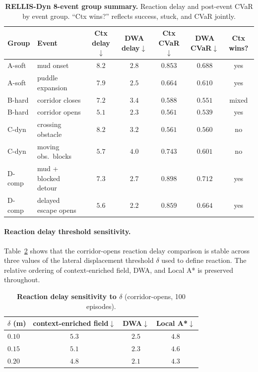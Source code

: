 \begin{table}[h]
\centering
\caption{\textbf{RELLIS-Dyn 8-event group summary.}
Reaction delay and post-event CVaR by event group.
``Ctx wins?'' reflects success, stuck, and CVaR jointly.}
\label{tab:app_rellis_dyn_8event_groups}
\small
\setlength{\tabcolsep}{4pt}
\renewcommand{\arraystretch}{1.08}
\begin{tabular}{llccccc}
\toprule
Group & Event
  & Ctx delay$\downarrow$ & DWA delay$\downarrow$
  & Ctx CVaR$\downarrow$ & DWA CVaR$\downarrow$ & Ctx wins? \\
\midrule
A-soft & mud onset             & $8.2$ & $2.8$ & $0.853$ & $0.688$ & yes \\
A-soft & puddle expansion      & $7.9$ & $2.5$ & $0.664$ & $0.610$ & yes \\
B-hard & corridor closes       & $7.2$ & $3.4$ & $0.588$ & $0.551$ & mixed \\
B-hard & corridor opens        & $5.1$ & $2.3$ & $0.561$ & $0.539$ & yes \\
C-dyn  & crossing obstacle     & $8.2$ & $3.2$ & $0.561$ & $0.560$ & no \\
C-dyn  & moving obs.\ blocks   & $5.7$ & $4.0$ & $0.743$ & $0.601$ & no \\
D-comp & mud + blocked detour  & $7.3$ & $2.7$ & $0.898$ & $0.712$ & yes \\
D-comp & delayed escape opens  & $5.6$ & $2.2$ & $0.859$ & $0.664$ & yes \\
\bottomrule
\end{tabular}
\end{table}

\paragraph{Reaction delay threshold sensitivity.}

Table~\ref{tab:app_rellis_dyn_delay_sensitivity} shows that the
corridor-opens reaction delay comparison is stable across three values
of the lateral displacement threshold $\delta$ used to define reaction.
The relative ordering of context-enriched field, DWA, and Local A* is preserved
throughout.

\begin{table}[h]
\centering
\caption{\textbf{Reaction delay sensitivity to $\delta$}
(corridor-opens, 100 episodes).}
\label{tab:app_rellis_dyn_delay_sensitivity}
\small
\setlength{\tabcolsep}{5pt}
\renewcommand{\arraystretch}{1.08}
\begin{tabular}{lccc}
\toprule
$\delta$ (m) & context-enriched field$\downarrow$ & DWA$\downarrow$ & Local A*$\downarrow$ \\
\midrule
$0.10$ & $5.3$ & $2.5$ & $4.8$ \\
$0.15$ & $5.1$ & $2.3$ & $4.6$ \\
$0.20$ & $4.8$ & $2.1$ & $4.3$ \\
\bottomrule
\end{tabular}
\end{table}

